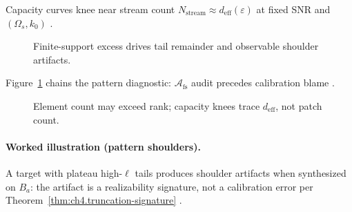\begin{lemma}
\label{lem:ch4.capacity-knee}
Capacity curves knee near stream count \(N_{\mathrm{stream}}\approx d_{\mathrm{eff}}(\varepsilon)\) at fixed SNR and \((\Omega_{s},k_{0})\)
\cite{harrington2001,devaney2004,hansen1988,stratton1941,jackson1999}.
\end{lemma}

\begin{figure}[t]
\centering
{}
\caption{Finite-support excess drives tail remainder and observable shoulder artifacts.}
\label{fig:ch4.truncation-signatures}
\end{figure}

Figure~\ref{fig:ch4.truncation-signatures} chains the pattern diagnostic: \(\mathcal{A}_{\mathrm{fs}}\) audit precedes calibration blame \cite{hansen1988,harrington2001,stratton1941,devaney2004}.

\begin{figure}[t]
\centering
{}
\caption{Element count may exceed rank; capacity knees trace \(d_{\mathrm{eff}}\), not patch count.}
\label{fig:ch4.capacity-knee-map}
\end{figure}

\paragraph{Worked illustration (pattern shoulders).}
A target with plateau high-\(\ell\) tails produces shoulder artifacts when synthesized on \(B_{a}\): the artifact is a realizability signature, not a
calibration error per Theorem~\ref{thm:ch4.truncation-signature} \cite{hansen1988,jackson1999,harrington2001,devaney2004}.

